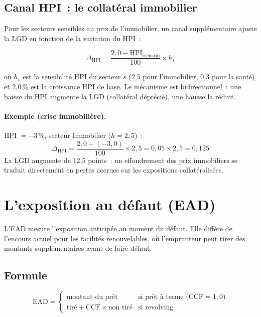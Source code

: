 \documentclass[12pt, a4paper, twoside, openright]{report}
\theoremstyle{definition}
\begin{document}
\subsection{Canal HPI~: le collatéral immobilier}

Pour les secteurs sensibles au prix de l'immobilier, un canal supplémentaire ajuste la LGD en fonction de la variation du HPI~:

\begin{equation}
\Delta_{\text{HPI}} = \frac{2{,}0 - \text{HPI}_{\text{scénario}}}{100} \times h_s
\label{eq:lgd-hpi}
\end{equation}

\noindent où $h_s$ est la sensibilité HPI du secteur $s$ (2{,}5 pour l'immobilier, 0{,}3 pour la santé), et 2{,}0\,\% est la croissance HPI de base. Le mécanisme est bidirectionnel~: une baisse du HPI augmente la LGD (collatéral déprécié), une hausse la réduit.

\paragraph{Exemple (crise immobilière).} HPI $= -3\,\%$, secteur Immobilier ($h = 2{,}5$)~:
$$\Delta_{\text{HPI}} = \frac{2{,}0 - (-3{,}0)}{100} \times 2{,}5 = 0{,}05 \times 2{,}5 = 0{,}125$$
La LGD augmente de 12{,}5 points~: un effondrement des prix immobiliers se traduit directement en pertes accrues sur les expositions collatéralisées.

\section{L'exposition au défaut (EAD)}
\label{sec:ecl:ead}

L'EAD mesure l'exposition anticipée au moment du défaut. Elle diffère de l'encours actuel pour les facilités renouvelables, où l'emprunteur peut tirer des montants supplémentaires avant de faire défaut.

\subsection{Formule}

\begin{equation}
\text{EAD} = \begin{cases}
\text{montant du prêt} & \text{si prêt à terme (CCF} = 1{,}0\text{)} \\
\text{tiré} + \text{CCF} \times \text{non tiré} & \text{si revolving}
\end{cases}
\label{eq:ead}
\end{equation}
\end{document}
